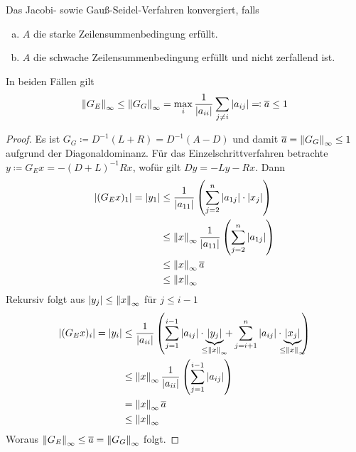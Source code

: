 \begin{Satze}[Zeilensummenkriterium]
  \label{9.3.9}
  Das Jacobi- sowie Gauß-Seidel-Verfahren konvergiert, falls 
  \begin{enumerate}[a)]
  \item $A$ die starke Zeilensummenbedingung erfüllt.
  \item $A$ die schwache Zeilensummenbedingung erfüllt und nicht
    zerfallend ist.
  \end{enumerate}
  In beiden Fällen gilt
  \begin{gather}
    \nn[G_E]_\infty \leq \nn[G_G]_\infty 
    = \max_i\frac{1}{|a_{ii}|}\sum_{j\neq i} |a_{ij}|
    \eqqcolon \overline{a} \leq 1
    \label{IX.3.9}
  \end{gather}
  \begin{proof}
    Es ist $G_G\coloneqq D^{-1}(L+R) = D^{-1}(A-D)$ und damit 
    $\overline{a}=\nn[G_G]_\infty\leq 1$ aufgrund der Diagonaldominanz.
    Für das Einzelschrittverfahren betrachte 
    $y\coloneqq G_E x=-(D+L)^{-1}Rx$, wofür gilt
    $Dy = -Ly-Rx$. Dann
    \begin{align*}
      |(G_Ex)_1| = |y_1| &\leq \frac{1}{|a_{11}|}\left(
                           \sum_{j=2}^{n}|a_{1j}|\cdot |x_j|
                           \right) \\
                         &\leq \nn[x]_\infty \frac{1}{|a_{11}|}\left(
                           \sum_{j=2}^{n}|a_{1j}|
                           \right) \\
                         &\leq \nn[x]_\infty \overline{a}\\
                         &\leq \nn[x]_\infty
    \end{align*}
    Rekursiv folgt aus $|y_j|\leq \nn[x]_\infty $ für $j\leq i-1$
    \begin{align}\nonumber
      |(G_Ex)_i| = |y_i| &\leq \frac{1}{|a_{ii}|}\left(
                           \sum_{j=1}^{i-1}|a_{ij}|
                           \cdot \underbrace{|y_j|}_{\mathclap{\leq\nn[x]_\infty}}
                           +\sum_{j=i+1}^{n}|a_{ij}|
                           \cdot \underbrace{|x_j|}_{\mathclap{\leq\nn[x]_\infty}}
                           \right)\\\nonumber
                         &\leq \nn[x]_\infty \frac{1}{|a_{ii}|}\left(
                           \sum_{j=1}^{i-1}|a_{ij}|
                           \right) \\\nonumber
                         &=\nn[x]_\infty \overline{a}\\
                         &\leq \nn[x]_\infty
                           \label{IX.3.10}
    \end{align}
    Woraus $\nn[G_E]_\infty \leq \overline{a}=\nn[G_G]_\infty$ folgt.


\end{proof}
\end{Satze}
